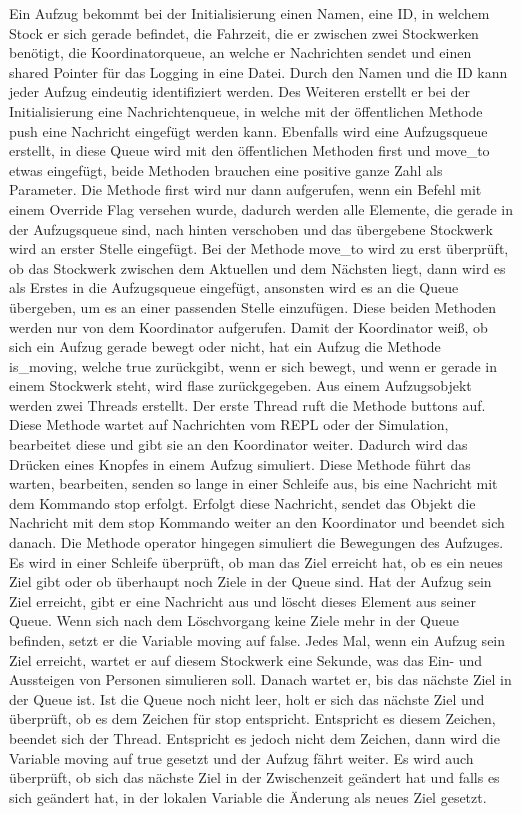 Ein Aufzug bekommt bei der Initialisierung einen Namen, eine ID, in welchem Stock er sich gerade befindet, die Fahrzeit, die er zwischen zwei Stockwerken benötigt, die Koordinatorqueue, an welche er Nachrichten sendet und einen shared Pointer für das Logging in eine Datei. Durch den Namen und die ID kann jeder Aufzug eindeutig identifiziert werden. Des Weiteren erstellt er bei der Initialisierung eine Nachrichtenqueue, in welche mit der öffentlichen Methode push eine Nachricht eingefügt werden kann. Ebenfalls wird eine Aufzugsqueue erstellt, in diese Queue wird mit den öffentlichen Methoden first und move\_to etwas eingefügt, beide Methoden brauchen eine positive ganze Zahl als Parameter. Die Methode first wird nur dann aufgerufen, wenn ein Befehl mit einem Override Flag versehen wurde, dadurch werden alle Elemente, die gerade in der Aufzugsqueue sind, nach hinten verschoben und das übergebene Stockwerk wird an erster Stelle eingefügt. Bei der Methode move\_to wird zu erst überprüft, ob das Stockwerk zwischen dem Aktuellen und dem Nächsten liegt, dann wird es als Erstes in die Aufzugsqueue eingefügt, ansonsten wird es an die Queue übergeben, um es an einer passenden Stelle einzufügen. Diese beiden Methoden werden nur von dem Koordinator aufgerufen. Damit der Koordinator weiß, ob sich ein Aufzug gerade bewegt oder nicht, hat ein Aufzug die Methode is\_moving, welche true zurückgibt, wenn er sich bewegt, und wenn er gerade in einem Stockwerk steht, wird flase zurückgegeben. Aus einem Aufzugsobjekt werden zwei Threads erstellt. Der erste Thread ruft die Methode buttons auf.  Diese Methode wartet auf Nachrichten vom REPL oder der Simulation, bearbeitet diese und gibt sie an den Koordinator weiter. Dadurch wird das Drücken eines Knopfes in einem Aufzug simuliert. Diese Methode führt das warten, bearbeiten, senden so lange in einer Schleife aus, bis eine Nachricht mit dem Kommando stop erfolgt. Erfolgt diese Nachricht, sendet das Objekt die Nachricht mit dem stop Kommando weiter an den Koordinator und beendet sich danach. Die Methode operator hingegen simuliert die Bewegungen des Aufzuges. Es wird in einer Schleife überprüft, ob man das Ziel erreicht hat, ob es ein neues Ziel gibt oder ob überhaupt noch Ziele in der Queue sind. Hat der Aufzug sein Ziel erreicht, gibt er eine Nachricht aus und löscht dieses Element aus seiner Queue. Wenn sich nach dem Löschvorgang keine Ziele mehr in der Queue befinden, setzt er die Variable moving auf false. Jedes Mal, wenn ein Aufzug sein Ziel erreicht, wartet er auf diesem Stockwerk eine Sekunde, was das Ein- und Aussteigen von Personen simulieren soll. Danach wartet er, bis das nächste Ziel in der Queue ist. Ist die Queue noch nicht leer, holt er sich das nächste Ziel und überprüft, ob es dem Zeichen für stop entspricht. Entspricht es diesem Zeichen, beendet sich der Thread. Entspricht es jedoch nicht dem Zeichen, dann wird die Variable moving auf true gesetzt und der Aufzug fährt weiter. Es wird auch überprüft, ob sich das nächste Ziel in der Zwischenzeit geändert hat und falls es sich geändert hat, in der lokalen Variable die Änderung als neues Ziel gesetzt.